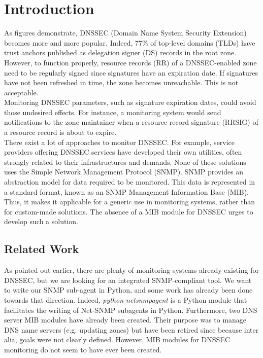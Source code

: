 \section{Introduction}
\label{chap:introduction}
As figures demonstrate, DNSSEC (Domain Name System Security Extension) becomes more and more popular. Indeed, 77\% of top-level domains (TLDs) have trust anchors published as delegation signer (DS) records in the root zone\cite{stats}. However, to function properly, resource records (RR) of a DNSSEC-enabled zone need to be regularly signed since signatures have an expiration date. If signatures have not been refreshed in time, the zone becomes unreachable. This is not acceptable.
\\
Monitoring DNSSEC parameters, such as signature expiration dates, could avoid those undesired effects. For instance, a monitoring system would send notifications to the zone maintainer when a resource record signature (RRSIG) of a resource record is about to expire.
\\
There exist a lot of approaches to monitor DNSSEC. For example, service providers offering DNSSEC services have developed their own utilities, often strongly related to their infrastructures and demands. None of these solutions uses the Simple Network Management Protocol (SNMP). SNMP provides an abstraction model for data required to be monitored. This data is represented in a standard format, known as an SNMP Management Information Base (MIB). Thus, it makes it applicable for a generic use in monitoring systems, rather than for custom-made solutions. The absence of a MIB module for DNSSEC urges to develop such a solution.

\subsection{Related Work}
As pointed out earlier, there are plenty of monitoring systems already existing for DNSSEC\cite{list}, but we are looking for an integrated SNMP-compliant tool. We want to write our SNMP sub-agent in Python, and some work has already been done towards that direction. Indeed, \textit{python-netsnmpagent}\cite{pythonnetsnmpagent} is a Python module that facilitates the writing of Net-SNMP subagents in Python.
Furthermore, two DNS server MIB\cite{dnsmib} \cite{dnsmib2} modules have already been created. Their purpose was to manage DNS name servers (e.g. updating zones) but have been retired since\cite{dnsmib_retire} because inter alia, goals were not clearly defined. However, MIB modules for DNSSEC monitoring do not seem to have ever been created.


